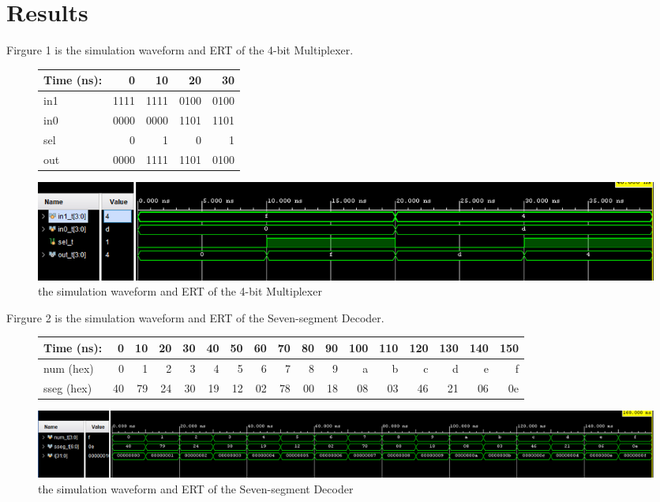 \documentclass[11pt]{article}
\begin{document}
\section*{Results}	

	Firgure 1 is the simulation waveform and ERT of the 4-bit Multiplexer.
	\begin{figure}[ht]\centering
		\begin{tabular}{l|rrrr}
			Time (ns): & 0 & 10 & 20 & 30 \\
			\midrule
			in1 & 1111 & 1111 & 0100 & 0100 \\
			in0 & 0000 & 0000 & 1101 & 1101 \\
			sel & 0 & 1 & 0 & 1 \\
			\midrule
			out & 0000 & 1111 & 1101 & 0100 \\
			\bottomrule
		\end{tabular}\medskip
		
		\includegraphics[width=1\textwidth]{mux2_4b_simulation}
		\caption{the simulation waveform and ERT of the 4-bit Multiplexer}
		\label{fig:mux2_4b_simulation}
	\end{figure}
	
	Firgure 2 is the simulation waveform and ERT of the Seven-segment Decoder.
	\begin{figure}[ht]\centering
		\begin{tabular}{l|rrrr|rrrr|rrrr|rrrr}
			Time (ns): & 0 & 10 & 20 & 30 & 40 & 50 & 60 & 70 & 80 & 90 & 100 & 110 & 120 & 130 & 140 & 150 \\
			\midrule
			num (hex) & 0 & 1 & 2 & 3 & 4 & 5 & 6 & 7 & 8 & 9 & a & b & c & d & e & f \\
			\midrule
			sseg (hex) & 40 & 79 & 24 & 30 & 19 & 12 & 02 & 78 & 00 & 18 & 08 & 03 & 46 & 21 & 06 & 0e \\
			\bottomrule
		\end{tabular}\medskip
		
		\includegraphics[width=1\textwidth]{sseg_decoder_simulation}
		\caption{the simulation waveform and ERT of the Seven-segment Decoder}
		\label{fig:sseg_decoder_simulation}
	\end{figure}
	
\end{document}
